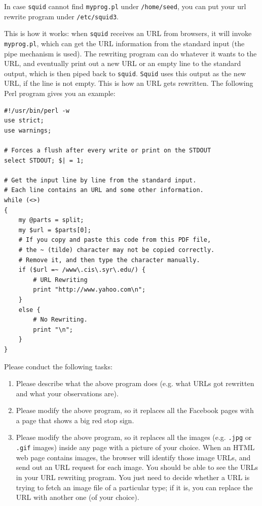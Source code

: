 In case {\tt squid} cannot find {\tt myprog.pl} under {\tt /home/seed},
you can put your url rewrite program under {\tt /etc/squid3}. 

This is how it works: when {\tt squid} receives an URL from browsers,
it will invoke {\tt myprog.pl}, which can get the URL information
from the standard input (the pipe mechanism is used). 
The rewriting program can
do whatever it wants to the URL, and eventually print out a new 
URL or an empty line to the standard output, which is then piped back to {\tt squid}. 
{\tt Squid} uses this output as the new URL, if the line is not empty. 
This is how an URL gets rewritten. 
The following Perl program gives you an example:
\begin{Verbatim}[frame=single] 
#!/usr/bin/perl -w
use strict;
use warnings;

# Forces a flush after every write or print on the STDOUT
select STDOUT; $| = 1;

# Get the input line by line from the standard input.
# Each line contains an URL and some other information.
while (<>)
{
    my @parts = split;  
    my $url = $parts[0];
    # If you copy and paste this code from this PDF file, 
    # the ~ (tilde) character may not be copied correctly. 
    # Remove it, and then type the character manually.
    if ($url =~ /www\.cis\.syr\.edu/) {  
        # URL Rewriting
        print "http://www.yahoo.com\n";
    }
    else { 
        # No Rewriting. 
        print "\n";
    }
}
\end{Verbatim}



Please conduct the following tasks:
\begin{enumerate}
\item Please describe what the above program does (e.g. what URLs got rewritten
and what your observations are).

\item Please modify the above program, so it replaces all the Facebook pages with a 
page that shows a big red stop sign. 

\item Please modify the above program, so it replaces all the images (e.g.
{\tt .jpg} or {\tt .gif} images) inside any page with a picture of your choice. 
When an HTML web page contains images, the browser will identify those
image URLs, and send out an URL request for each image. You should be able
to see the URLs in your URL
rewriting program. You just need to decide whether a URL is trying to
fetch an image file of a particular type; if it is, you can replace the URL
with another one (of your choice). 


\end{enumerate}


